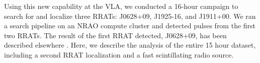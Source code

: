 Using this new capability at the VLA, we conducted a 16-hour campaign to search for and localize three RRATs: J0628+09, J1925-16, and J1911+00. We ran a search pipeline on an NRAO compute cluster and detected pulses from the first two RRATs. The result of the first RRAT detected, J0628+09, has been described elsewhere \citep{Law_2012}. Here, we describe the analysis of the entire 15 hour dataset, including a second RRAT localization and a fast scintillating radio source.

  
  
  
  
  
  
  
  
  
  
  
  